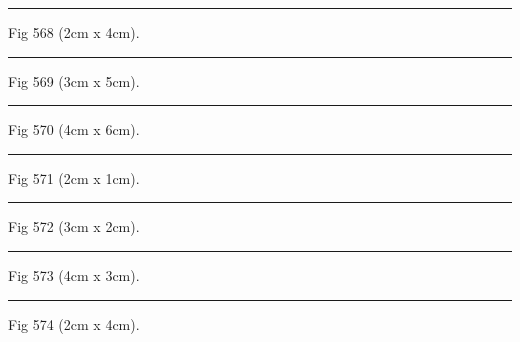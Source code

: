 \documentclass[a4paper,11pt]{article}
\begin{document}
\begin{swarmwrap}%
  \begin{minipage}[t]{2cm}
    \centering
    \rule{\linewidth}{4cm}
    {\footnotesize Fig 568 (2cm x 4cm).}
  \end{minipage}%
\end{swarmwrap}%
\swarmwrapnext
\lipsum[118]%

\begin{swarmwrap}%
  \begin{minipage}[t]{3cm}
    \centering
    \rule{\linewidth}{5cm}
    {\footnotesize Fig 569 (3cm x 5cm).}
  \end{minipage}%
\end{swarmwrap}%
\swarmwrapnext
\lipsum[119]%

\begin{swarmwrap}%
  \begin{minipage}[t]{4cm}
    \centering
    \rule{\linewidth}{6cm}
    {\footnotesize Fig 570 (4cm x 6cm).}
  \end{minipage}%
\end{swarmwrap}%
\swarmwrapnext
\lipsum[120]%

\begin{swarmwrap}%
  \begin{minipage}[t]{2cm}
    \centering
    \rule{\linewidth}{1cm}
    {\footnotesize Fig 571 (2cm x 1cm).}
  \end{minipage}%
\end{swarmwrap}%
\swarmwrapnext
\lipsum[121]%

\begin{swarmwrap}%
  \begin{minipage}[t]{3cm}
    \centering
    \rule{\linewidth}{2cm}
    {\footnotesize Fig 572 (3cm x 2cm).}
  \end{minipage}%
\end{swarmwrap}%
\swarmwrapnext
\lipsum[122]%

\begin{swarmwrap}%
  \begin{minipage}[t]{4cm}
    \centering
    \rule{\linewidth}{3cm}
    {\footnotesize Fig 573 (4cm x 3cm).}
  \end{minipage}%
\end{swarmwrap}%
\swarmwrapnext
\lipsum[123]%

\begin{swarmwrap}%
  \begin{minipage}[t]{2cm}
    \centering
    \rule{\linewidth}{4cm}
    {\footnotesize Fig 574 (2cm x 4cm).}
  \end{minipage}%
\end{swarmwrap}%
\swarmwrapnext
\lipsum[124]%
\end{document}

